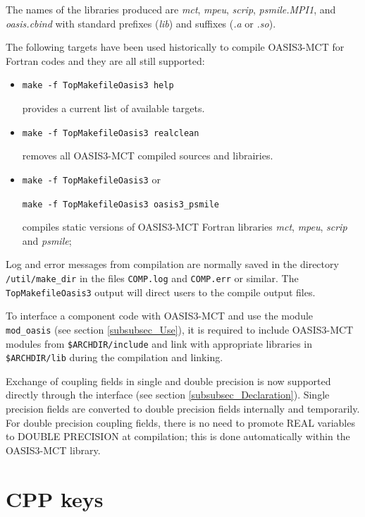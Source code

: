 The names of the libraries produced
are {\it mct}, {\it mpeu},  {\it scrip}, {\it psmile.MPI1}, and {\it oasis.cbind}
with standard prefixes ({\it lib}) and suffixes ({\it .a} or {\it .so}).

The following targets have been used historically to compile
OASIS3-MCT for Fortran 
codes and they are all still supported:

\begin{itemize}
\item {\tt make -f TopMakefileOasis3 help}

  provides a current list of available targets.

\item {\tt make -f TopMakefileOasis3 realclean}

  removes all OASIS3-MCT compiled sources and librairies.

\item {\tt make -f TopMakefileOasis3} or

      {\tt make -f TopMakefileOasis3 oasis3\_psmile}

  compiles static versions of OASIS3-MCT Fortran libraries {\it mct}, {\it mpeu},
  {\it scrip} and {\it psmile};

\end{itemize}

Log and error messages from compilation are normally saved in the directory
{\tt /util/make\_dir} in the files
{\tt COMP.log} and {\tt COMP.err} or similar.  The {\tt TopMakefileOasis3}
output will direct users to the compile output files.

To interface a component code with OASIS3-MCT and use the module {\tt mod\_oasis} (see section \ref{subsubsec_Use}), it is required to include OASIS3-MCT modules from {\tt \$ARCHDIR/include} and link with appropriate libraries in {\tt \$ARCHDIR/lib} during the compilation and linking.

Exchange of coupling fields in single and double precision is now supported directly through the interface 
(see section \ref{subsubsec_Declaration}).  Single precision fields are converted to double precision fields internally and temporarily.
For double precision coupling fields, there is no need to promote REAL variables to DOUBLE PRECISION at compilation; this is done automatically within the OASIS3-MCT library.

\section{CPP keys}
\label{subsec_cpp}

